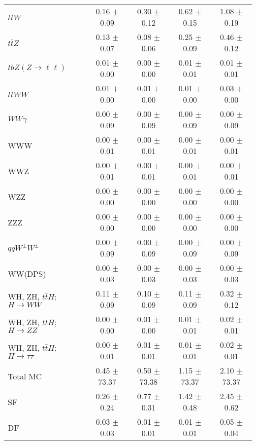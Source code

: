 \begin{tabular}{l|cccc}
                   $t\overline{t}W$ &  0.16 $\pm$  0.09 &  0.30 $\pm$  0.12 &  0.62 $\pm$  0.15 &  1.08 $\pm$  0.19 \\
                   $t\overline{t}Z$ &  0.13 $\pm$  0.07 &  0.08 $\pm$  0.06 &  0.25 $\pm$  0.09 &  0.46 $\pm$  0.12 \\
    $tbZ (Z \rightarrow \ell \ell)$ &  0.01 $\pm$  0.00 &  0.00 $\pm$  0.00 &  0.01 $\pm$  0.01 &  0.01 $\pm$  0.01 \\
                  $t\overline{t}WW$ &  0.01 $\pm$  0.00 &  0.01 $\pm$  0.00 &  0.01 $\pm$  0.00 &  0.03 $\pm$  0.00 \\
                         $WW\gamma$ &  0.00 $\pm$  0.09 &  0.00 $\pm$  0.09 &  0.00 $\pm$  0.09 &  0.00 $\pm$  0.09 \\
                                WWW &  0.00 $\pm$  0.01 &  0.00 $\pm$  0.01 &  0.00 $\pm$  0.01 &  0.00 $\pm$  0.01 \\
                                WWZ &  0.00 $\pm$  0.01 &  0.00 $\pm$  0.01 &  0.00 $\pm$  0.01 &  0.00 $\pm$  0.01 \\
                                WZZ &  0.00 $\pm$  0.00 &  0.00 $\pm$  0.00 &  0.00 $\pm$  0.00 &  0.00 $\pm$  0.00 \\
                                ZZZ &  0.00 $\pm$  0.00 &  0.00 $\pm$  0.00 &  0.00 $\pm$  0.00 &  0.00 $\pm$  0.00 \\
                 $qqW^{\pm}W^{\pm}$ &  0.00 $\pm$  0.09 &  0.00 $\pm$  0.09 &  0.00 $\pm$  0.09 &  0.00 $\pm$  0.09 \\
                            WW(DPS) &  0.00 $\pm$  0.03 &  0.00 $\pm$  0.03 &  0.00 $\pm$  0.03 &  0.00 $\pm$  0.03 \\
WH, ZH, $t\bar{t}H$; $H \rightarrow WW$ &  0.11 $\pm$  0.09 &  0.10 $\pm$  0.09 &  0.11 $\pm$  0.09 &  0.32 $\pm$  0.12 \\
WH, ZH, $t\bar{t}H$; $H \rightarrow ZZ$ &  0.00 $\pm$  0.00 &  0.01 $\pm$  0.00 &  0.01 $\pm$  0.01 &  0.02 $\pm$  0.01 \\
WH, ZH, $t\bar{t}H$; $H \rightarrow \tau\tau$ &  0.00 $\pm$  0.01 &  0.01 $\pm$  0.01 &  0.01 $\pm$  0.01 &  0.02 $\pm$  0.01 \\
\hline\hline
                           Total MC &  0.45 $\pm$ 73.37 &  0.50 $\pm$ 73.38 &  1.15 $\pm$ 73.37 &  2.10 $\pm$ 73.37 \\
\hline
                                 SF &  0.26 $\pm$  0.24 &  0.77 $\pm$  0.31 &  1.42 $\pm$  0.48 &  2.45 $\pm$  0.62 \\
                                 DF &  0.03 $\pm$  0.03 &  0.01 $\pm$  0.01 &  0.01 $\pm$  0.01 &  0.05 $\pm$  0.04 \\

\end{tabular}
